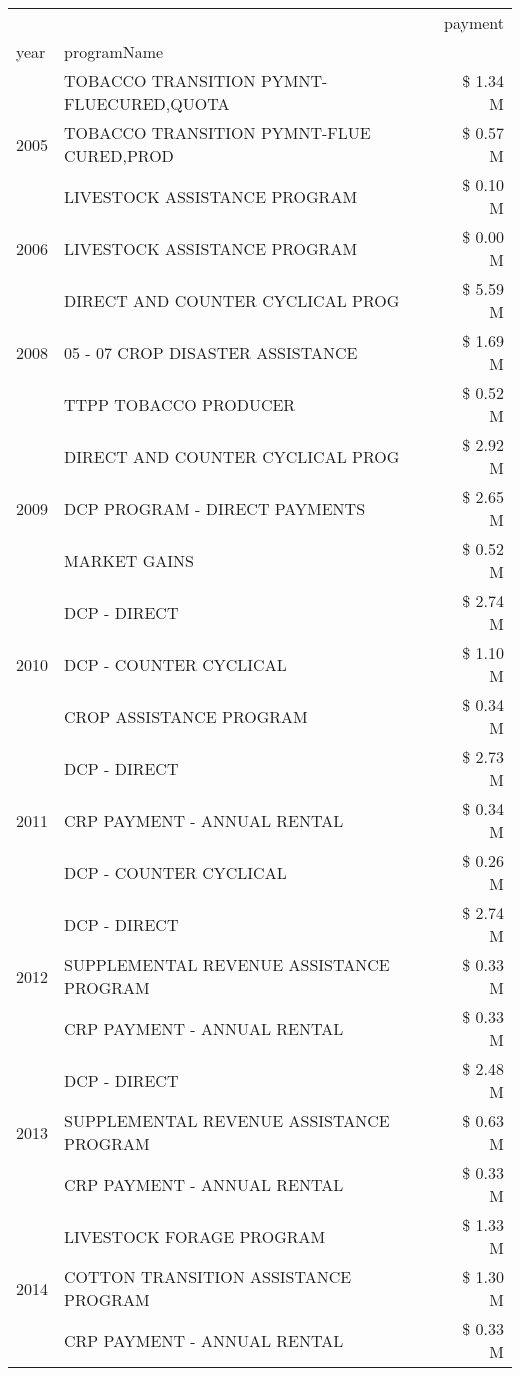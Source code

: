 \begin{tabular}{llr}
\toprule
 &  & payment \\
year & programName &  \\
\midrule
\multirow[t]{3}{*}{2005} & TOBACCO TRANSITION PYMNT-FLUECURED,QUOTA & \$ 1.34 M \\
 & TOBACCO TRANSITION PYMNT-FLUE CURED,PROD & \$ 0.57 M \\
 & LIVESTOCK ASSISTANCE PROGRAM & \$ 0.10 M \\
\cline{1-3}
2006 & LIVESTOCK ASSISTANCE PROGRAM & \$ 0.00 M \\
\cline{1-3}
\multirow[t]{3}{*}{2008} & DIRECT AND COUNTER CYCLICAL PROG & \$ 5.59 M \\
 & 05 - 07 CROP DISASTER ASSISTANCE & \$ 1.69 M \\
 & TTPP TOBACCO PRODUCER & \$ 0.52 M \\
\cline{1-3}
\multirow[t]{3}{*}{2009} & DIRECT AND COUNTER CYCLICAL PROG & \$ 2.92 M \\
 & DCP PROGRAM - DIRECT PAYMENTS & \$ 2.65 M \\
 & MARKET GAINS & \$ 0.52 M \\
\cline{1-3}
\multirow[t]{3}{*}{2010} & DCP - DIRECT & \$ 2.74 M \\
 & DCP - COUNTER CYCLICAL & \$ 1.10 M \\
 & CROP ASSISTANCE PROGRAM & \$ 0.34 M \\
\cline{1-3}
\multirow[t]{3}{*}{2011} & DCP - DIRECT & \$ 2.73 M \\
 & CRP PAYMENT - ANNUAL RENTAL & \$ 0.34 M \\
 & DCP - COUNTER CYCLICAL & \$ 0.26 M \\
\cline{1-3}
\multirow[t]{3}{*}{2012} & DCP - DIRECT & \$ 2.74 M \\
 & SUPPLEMENTAL REVENUE ASSISTANCE PROGRAM & \$ 0.33 M \\
 & CRP PAYMENT - ANNUAL RENTAL & \$ 0.33 M \\
\cline{1-3}
\multirow[t]{3}{*}{2013} & DCP - DIRECT & \$ 2.48 M \\
 & SUPPLEMENTAL REVENUE ASSISTANCE PROGRAM & \$ 0.63 M \\
 & CRP PAYMENT - ANNUAL RENTAL & \$ 0.33 M \\
\cline{1-3}
\multirow[t]{3}{*}{2014} & LIVESTOCK FORAGE PROGRAM & \$ 1.33 M \\
 & COTTON TRANSITION ASSISTANCE PROGRAM & \$ 1.30 M \\
 & CRP PAYMENT - ANNUAL RENTAL & \$ 0.33 M \\

\end{tabular}
